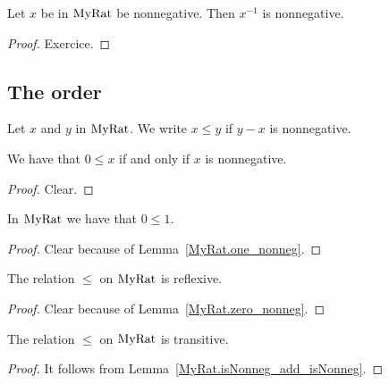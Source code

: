 \begin{lemma}
    \label{MyRat.isNonneg_inv_isNonneg}
    \leanok
    Let $x$ be in $\mathrm{MyRat}$ be nonnegative. Then $x^{-1}$ is nonnegative.
\end{lemma}
\begin{proof}
    \leanok
    Exercice.
\end{proof}

\subsection{The order}

\begin{definition}
    \label{MyRat.le}
    \leanok
Let $x$ and $y$ in $\mathrm{MyRat}$. We write $x \leq y$ if $y - x$ is nonnegative.
\end{definition}

\begin{lemma}
    \label{MyRat.zero_le_iff_IsNonneg}
    \leanok
    We have that $0 \leq x$ if and only if $x$ is nonnegative.
\end{lemma}
\begin{proof}
    \leanok
    Clear.
\end{proof}

\begin{lemma}
    \label{MyRat.zero_le_one}
    \leanok
    In $\mathrm{MyRat}$ we have that $0 \leq 1$.
\end{lemma}
\begin{proof}
    \leanok
    Clear because of Lemma~\ref{MyRat.one_nonneg}.
\end{proof}

\begin{lemma}
    \label{MyRat.le_refl}
    \leanok
    The relation $\leq$ on $\mathrm{MyRat}$ is reflexive.
\end{lemma}
\begin{proof}
    \leanok
    Clear because of Lemma~\ref{MyRat.zero_nonneg}.
\end{proof}

\begin{lemma}
    \label{MyRat.le_trans}
    \leanok
    The relation $\leq$ on $\mathrm{MyRat}$ is transitive.
\end{lemma}
\begin{proof}
    \leanok
 It follows from Lemma~\ref{MyRat.isNonneg_add_isNonneg}.
\end{proof}

